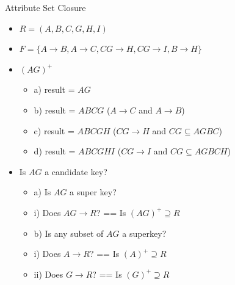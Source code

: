 \documentclass[aspectratio=169, xcolor=dvipsnames]{beamer}
\begin{document}
\begin{frame}{Attribute Set Closure}
    \begin{itemize}[<+->]
        \item $R = (A, B, C, G, H, I)$
        \item $F = \{A \rightarrow B, A \rightarrow C, CG \rightarrow H, CG \rightarrow I, B \rightarrow H\}$
        \item $(AG)^+$
        \begin{itemize}
            \item[$\triangleright$] a) result = $AG$
            \item[$\triangleright$] b) result = $ABCG$ \quad ($A \rightarrow C$ and $A \rightarrow B$)
            \item[$\triangleright$] c) result = $ABCGH$ \quad ($CG \rightarrow H$ and $CG \subseteq AGBC$)
            \item[$\triangleright$] d) result = $ABCGHI$ \quad ($CG \rightarrow I$ and $CG \subseteq AGBCH$)
        \end{itemize}
        \item Is $AG$ a candidate key?
        \begin{itemize}
            \item[$\triangleright$] a) Is $AG$ a super key?
            \item[$\triangleright$] i) Does $AG \rightarrow R$? == Is $(AG)^+ \supseteq R$
            \item[$\triangleright$] b) Is any subset of $AG$ a superkey?
            \item[$\triangleright$] i) Does $A \rightarrow R$? == Is $(A)^+ \supseteq R$
            \item[$\triangleright$] ii) Does $G \rightarrow R$? == Is $(G)^+ \supseteq R$
        \end{itemize}
    \end{itemize}
\end{frame}
\end{document}
